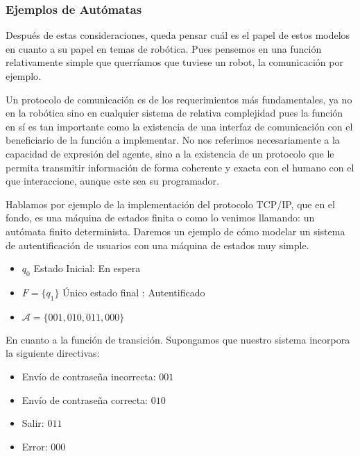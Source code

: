\subsubsection{Ejemplos de Autómatas}

Después de estas consideraciones, queda pensar cuál es el papel de estos modelos en cuanto a su papel en temas de robótica. Pues pensemos en una función relativamente simple que querríamos que tuviese un robot, la comunicación por ejemplo.

\vspace{10px}

Un protocolo de comunicación es de los requerimientos más fundamentales, ya no en la robótica sino en cualquier sistema de relativa complejidad pues la función en sí es tan importante como la existencia de una interfaz de comunicación con el beneficiario de la función a implementar. No nos referimos necesariamente a la capacidad de expresión del agente, sino a la existencia de un protocolo que le permita transmitir información de forma coherente y exacta con el humano con el que interaccione, aunque este sea su programador.

\vspace{10px}

Hablamos por ejemplo de la implementación del protocolo TCP/IP, que en el fondo, es una máquina de estados finita o como lo venimos llamando: un autómata finito determinista. Daremos un ejemplo de cómo modelar un sistema de autentificación de usuarios con una máquina de estados muy simple.

\begin{itemize}
	\item $q_0$ Estado Inicial: En espera
	\item $F=\{q_1\}$ Único estado final : Autentificado
	\item $\mathcal{A}=\{001,010,011,000\}$
\end{itemize}

En cuanto a la función de transición. Supongamos que nuestro sistema incorpora la siguiente directivas:

\begin{multicols}{2}
	\begin{itemize}
		\item Envío de contraseña incorrecta: $001$
		\item Envío de contraseña correcta: $010$
		\item Salir: $011$
		\item Error: $000$
	\end{itemize}
\end{multicols}

